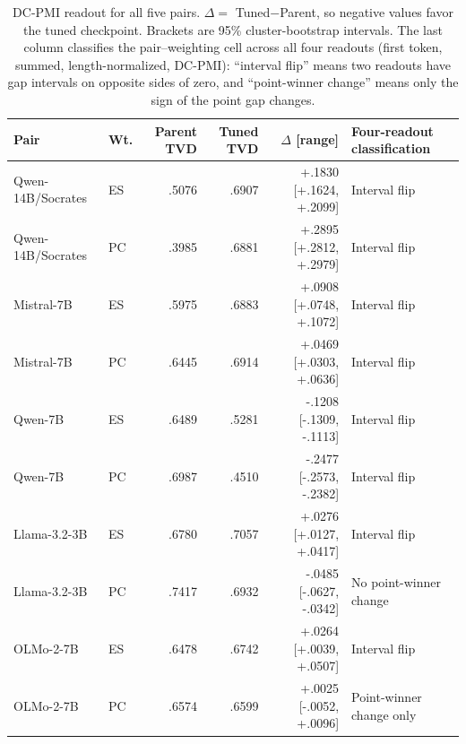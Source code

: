 \begin{table}[t]
\centering
\small
\setlength{\tabcolsep}{3pt}
\begin{tabular}{llrrrl}
\toprule
Pair & Wt. & Parent TVD & Tuned TVD & $\Delta$ [range] & Four-readout classification \\
\midrule
Qwen-14B/Socrates & ES & .5076 & .6907 & +.1830 [+.1624, +.2099] & Interval flip \\
Qwen-14B/Socrates & PC & .3985 & .6881 & +.2895 [+.2812, +.2979] & Interval flip \\
Mistral-7B & ES & .5975 & .6883 & +.0908 [+.0748, +.1072] & Interval flip \\
Mistral-7B & PC & .6445 & .6914 & +.0469 [+.0303, +.0636] & Interval flip \\
Qwen-7B & ES & .6489 & .5281 & -.1208 [-.1309, -.1113] & Interval flip \\
Qwen-7B & PC & .6987 & .4510 & -.2477 [-.2573, -.2382] & Interval flip \\
Llama-3.2-3B & ES & .6780 & .7057 & +.0276 [+.0127, +.0417] & Interval flip \\
Llama-3.2-3B & PC & .7417 & .6932 & -.0485 [-.0627, -.0342] & No point-winner change \\
OLMo-2-7B & ES & .6478 & .6742 & +.0264 [+.0039, +.0507] & Interval flip \\
OLMo-2-7B & PC & .6574 & .6599 & +.0025 [-.0052, +.0096] & Point-winner change only \\
\bottomrule
\end{tabular}
\caption{DC-PMI readout for all five pairs. $\Delta=$ Tuned$-$Parent, so negative values favor the tuned checkpoint. Brackets are 95\% cluster-bootstrap intervals. The last column classifies the pair--weighting cell across all four readouts (first token, summed, length-normalized, DC-PMI): ``interval flip'' means two readouts have gap intervals on opposite sides of zero, and ``point-winner change'' means only the sign of the point gap changes.}
\label{tab:dc-pmi-five-pair}
\end{table}
